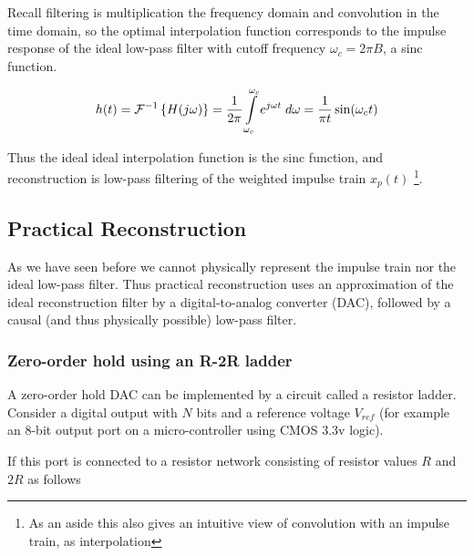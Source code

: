 Recall filtering is multiplication the frequency domain and convolution in the time domain, so the optimal interpolation function corresponds to the impulse response of the ideal low-pass filter with cutoff frequency $\omega_c = 2\pi B$, a sinc function.

\[
h(t) = \mathcal{F}^{-1} \left\{ H(j\omega) \right\} = \frac{1}{2\pi} \int\limits_{\-\omega_c}^{\omega_c} e^{j\omega t} \; d\omega = \frac{1}{\pi t}\sin(\omega_c t) 
\]

Thus the ideal ideal interpolation function is the sinc function, and reconstruction is low-pass filtering of the weighted impulse train $x_p(t)$ \footnote{As an aside this also gives an intuitive view of convolution with an impulse train, as interpolation}.

\subsection{Practical Reconstruction}

As we have seen before we cannot physically represent the impulse train nor the ideal low-pass filter. Thus practical reconstruction uses an approximation of the ideal reconstruction filter by a digital-to-analog converter (DAC), followed by a causal (and thus physically possible) low-pass filter.

\subsubsection{Zero-order hold using an R-2R ladder}

A zero-order hold DAC can be implemented by a circuit called a resistor ladder. Consider a digital output with $N$ bits and a reference voltage $V_{ref}$ (for example an 8-bit output port on a micro-controller using CMOS 3.3v logic).

If this port is connected to a resistor network consisting of resistor values $R$ and $2R$ as follows

